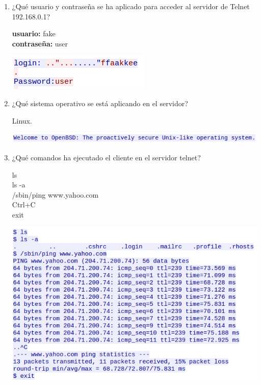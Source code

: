 \documentclass{article}
\begin{document}
\begin{enumerate}
\item ¿Qué usuario y contraseña se ha aplicado para acceder al servidor de Telnet
192.168.0.1?

\textbf{usuario:} fake\\
\textbf{contraseña:} user

\begin{center}
\includegraphics[scale=0.5]{images/login.png}
\end{center}
\item ¿Qué sistema operativo se está aplicando en el servidor?

Linux.

\begin{center}
\includegraphics[scale=0.5]{images/linux.png}
\end{center}
\item ¿Qué comandos ha ejecutado el cliente en el servidor telnet?

ls\\
ls -a\\
/sbin/ping www.yahoo.com\\
Ctrl+C\\
exit\\

\begin{center}
\includegraphics[scale=0.5]{images/command.png}
\end{center}
\end{enumerate}
\end{document}
